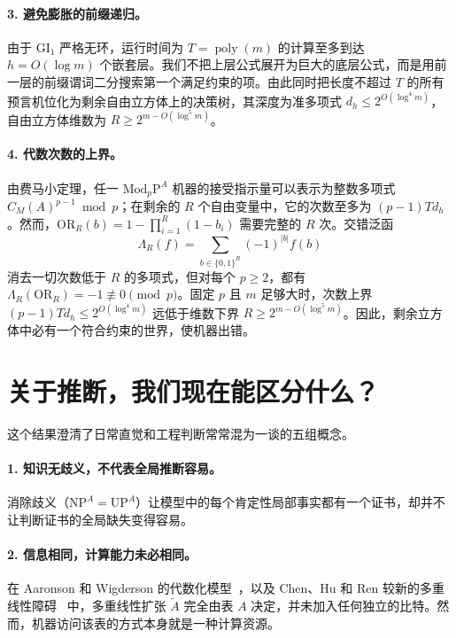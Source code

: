 \documentclass[11pt,a4paper]{article}
\newcommand{\NP}{\mathrm{NP}}
\newcommand{\UP}{\mathrm{UP}}
\newcommand{\MP}[1]{\mathrm{Mod}_{#1}\mathrm P}
\newcommand{\GI}{\mathrm{GI}_1}
\newcommand{\OR}{\mathrm{OR}}
\begin{document}
\paragraph{3. 避免膨胀的前缀递归。}
由于 $\GI$ 严格无环，运行时间为 $T=\operatorname{poly}(m)$ 的计算至多到达 $h=O(\log m)$ 个嵌套层。我们不把上层公式展开为巨大的底层公式，而是用前一层的前缀谓词二分搜索第一个满足约束的项。由此同时把长度不超过 $T$ 的所有预言机位化为剩余自由立方体上的决策树，其深度为准多项式 $d_h\le 2^{O(\log^4 m)}$，自由立方体维数为 $R\ge 2^{m-O(\log^5 m)}$。

\paragraph{4. 代数次数的上界。}
由费马小定理，任一 $\MP p^A$ 机器的接受指示量可以表示为整数多项式 $C_M(A)^{p-1}\bmod p$；在剩余的 $R$ 个自由变量中，它的次数至多为 $(p-1)Td_h$。然而，$\OR_R(b)=1-\prod_{i=1}^R(1-b_i)$ 需要完整的 $R$ 次。交错泛函
\[
 \Lambda_R(f)=\sum_{b\in\{0,1\}^R}(-1)^{|b|}f(b)
\]
消去一切次数低于 $R$ 的多项式，但对每个 $p\ge2$，都有 $\Lambda_R(\OR_R)=-1\not\equiv0\pmod p$。固定 $p$ 且 $m$ 足够大时，次数上界 $(p-1)Td_h\le 2^{O(\log^4 m)}$ 远低于维数下界 $R\ge 2^{m-O(\log^5 m)}$。因此，剩余立方体中必有一个符合约束的世界，使机器出错。

\section{关于推断，我们现在能区分什么？}
这个结果澄清了日常直觉和工程判断常常混为一谈的五组概念。

\paragraph{1. 知识无歧义，不代表全局推断容易。}
消除歧义（$\NP^A=\UP^A$）让模型中的每个肯定性局部事实都有一个证书，却并不让判断证书的全局缺失变得容易。

\paragraph{2. 信息相同，计算能力未必相同。}
在 Aaronson 和 Wigderson 的代数化模型~\cite{aw}，以及 Chen、Hu 和 Ren 较新的多重线性障碍~\cite{chr} 中，多重线性扩张 $\widetilde A$ 完全由表 $A$ 决定，并未加入任何独立的比特。然而，机器访问该表的方式本身就是一种计算资源。
\end{document}
